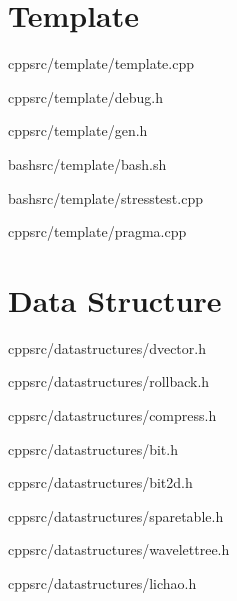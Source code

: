 \documentclass[portrait, 8pt, a4paper, oneside, twocolumn]{extarticle}
\begin{document}
\maketitlepage


\noindent\hrulefill

    \section{Template}
    {}
    {}
    {cpp}{src/template/template.cpp}

    \noindent\hrulefill

    {}
    {}
    {cpp}{src/template/debug.h}
    \noindent\hrulefill

    {}
    {}
    {cpp}{src/template/gen.h}
    \noindent\hrulefill

    {}
    {}
    {bash}{src/template/bash.sh}
    \noindent\hrulefill

    {}
    {}
    {bash}{src/template/stresstest.cpp}
    \noindent\hrulefill

    {}
    {}
    {cpp}{src/template/pragma.cpp}
    \noindent\hrulefill

\section{Data Structure}
	
    {}
    {}
    {cpp}{src/datastructures/dvector.h}
    \noindent\hrulefill

    {}
    {}
    {cpp}{src/datastructures/rollback.h}
    \noindent\hrulefill
    
    
    {}
    {}
    {cpp}{src/datastructures/compress.h}
    \noindent\hrulefill

    {}
    {}
    {cpp}{src/datastructures/bit.h}
    \noindent\hrulefill

    
    {}
    {}
    {cpp}{src/datastructures/bit2d.h}
    \noindent\hrulefill
    
   {}
   {}
   {cpp}{src/datastructures/sparetable.h}
   \noindent\hrulefill

    {}
    {}
    {cpp}{src/datastructures/wavelettree.h}
    \noindent\hrulefill

    {}
    {}
    {cpp}{src/datastructures/lichao.h}
    \noindent\hrulefill
\end{document}
